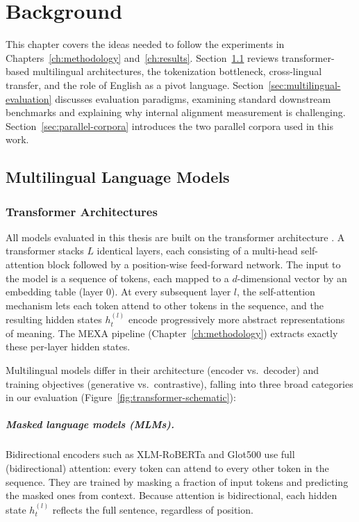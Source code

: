 \chapter{Background}
\label{ch:background}

This chapter covers the ideas needed to follow the experiments in Chapters~\ref{ch:methodology} and~\ref{ch:results}. Section~\ref{sec:multilingual-lm} reviews transformer-based multilingual architectures, the tokenization bottleneck, cross-lingual transfer, and the role of English as a pivot language. Section~\ref{sec:multilingual-evaluation} discusses evaluation paradigms, examining standard downstream benchmarks and explaining why internal alignment measurement is challenging. Section~\ref{sec:parallel-corpora} introduces the two parallel corpora used in this work.

\section{Multilingual Language Models}
\label{sec:multilingual-lm}

\subsection{Transformer Architectures}
\label{subsec:architectures-pretraining}

All models evaluated in this thesis are built on the transformer architecture \citep{vaswani2017attention}. A transformer stacks $L$ identical layers, each consisting of a multi-head self-attention block followed by a position-wise feed-forward network. The input to the model is a sequence of tokens, each mapped to a $d$-dimensional vector by an embedding table (layer 0). At every subsequent layer $l$, the self-attention mechanism lets each token attend to other tokens in the sequence, and the resulting hidden states $h_t^{(l)}$ encode progressively more abstract representations of meaning. The MEXA pipeline (Chapter~\ref{ch:methodology}) extracts exactly these per-layer hidden states.

Multilingual models differ in their architecture (encoder vs.\ decoder) and training objectives (generative vs.\ contrastive), falling into three broad categories in our evaluation (Figure~\ref{fig:transformer-schematic}):

\paragraph{Masked language models (MLMs).}
Bidirectional encoders such as XLM-RoBERTa \citep{conneau2020xlmr} and Glot500 \citep{imani2023glot500} use full (bidirectional) attention: every token can attend to every other token in the sequence. They are trained by masking a fraction of input tokens and predicting the masked ones from context. Because attention is bidirectional, each hidden state $h_t^{(l)}$ reflects the full sentence, regardless of position.

